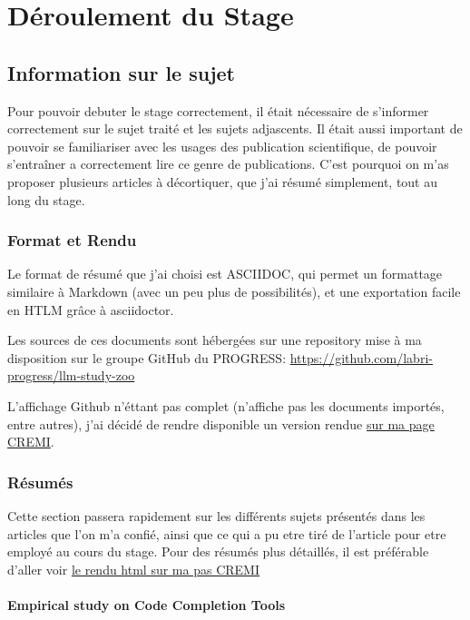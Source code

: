 \chapter{Déroulement du Stage}
\label{main}


\section{Information sur le sujet}

Pour pouvoir debuter le stage correctement, il était nécessaire de s'informer correctement sur le sujet traité et les sujets adjascents.
Il était aussi important de pouvoir se familiariser avec les usages des publication scientifique, de pouvoir s'entraîner a correctement
lire ce genre de publications.
C'est pourquoi on m'as proposer plusieurs articles à décortiquer, que j'ai résumé simplement, tout au long du stage.

\subsection{Format et Rendu}

Le format de résumé que j'ai choisi est ASCIIDOC, qui permet un formattage similaire à Markdown (avec un peu plus de possibilités), et une exportation facile en HTLM grâce à asciidoctor.

Les sources de ces documents sont hébergées sur une repository mise à ma disposition sur le groupe GitHub du PROGRESS:
\url{https://github.com/labri-progress/llm-study-zoo}

L'affichage Github n'éttant pas complet (n'affiche pas les documents importés, entre autres), j'ai décidé de rendre disponible un version rendue
\href{https://maxime-pico.emi.u-bordeaux.fr/stage-labri/llm-study-zoo/}{sur ma page CREMI}.


\subsection{Résumés}

Cette section passera rapidement sur les différents sujets présentés dans les articles que l'on m'a confié, ainsi que ce qui a pu etre tiré de l'article pour etre employé au cours du stage.
Pour des résumés plus détaillés, il est préférable d'aller voir \href{https://maxime-pico.emi.u-bordeaux.fr/stage-labri/llm-study-zoo/}{le rendu html sur ma pas CREMI}


\subsubsection{Empirical study on Code Completion Tools \cite{evalcodecompquality}}

